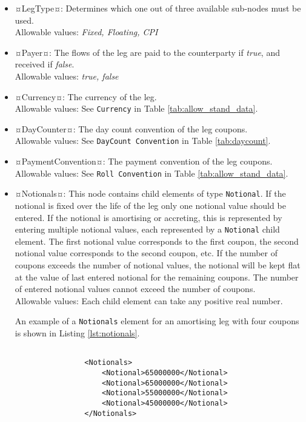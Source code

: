 \begin{itemize}
\item ¤LegType¤:  Determines which one out of three available sub-nodes must be used. \\ Allowable values:  \emph{Fixed, Floating, CPI}
\item ¤Payer¤:  The flows of the leg are paid to the counterparty if \emph{true}, and received if \emph{false}.  \\ Allowable values:  \emph{true, false} 
\item ¤Currency¤: The currency of the leg. \\ Allowable values:  See \lstinline!Currency! in Table \ref{tab:allow_stand_data}.
\item ¤DayCounter¤: The day count convention of the leg coupons. \\Allowable values: See \lstinline!DayCount Convention! in Table \ref{tab:daycount}.
\item ¤PaymentConvention¤: The payment convention of the leg coupons. \\Allowable values: See \lstinline!Roll Convention! in Table \ref{tab:allow_stand_data}.

\item ¤Notionals¤: This node contains child elements of type \lstinline!Notional!. If the notional is fixed over the life of the leg only one notional value should be entered. If the notional is amortising or accreting, this is represented by entering multiple notional values, each represented by a \lstinline!Notional! child element. The first notional value corresponds to the first coupon, the second notional value corresponds to the second coupon, etc. If the number of coupons exceeds the number of notional values, the notional will be kept flat at the value of last entered notional for the remaining coupons.  The number of entered notional values cannot exceed the number of coupons. \\Allowable values: Each child element can take any positive real number.

\vspace{1em}

An example of a \lstinline!Notionals! element for an amortising leg with four coupons is shown in Listing \ref{lst:notionals}.

{\footnotesize
\begin{lstlisting}[caption=Notionals, label=lst:notionals]

                <Notionals>
                    <Notional>65000000</Notional>
                    <Notional>65000000</Notional>
                    <Notional>55000000</Notional>
                    <Notional>45000000</Notional>
                </Notionals>


\end{lstlisting}}
\end{itemize}
